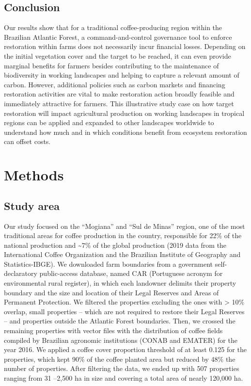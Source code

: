 \documentclass[
	12pt,				%
	oneside,			%
	a4paper,			%
	chapter=TITLE,		%
	section=TITLE,		%
	brazil,			%
	english				%
	]{abntex2}
\begin{document}
\hypertarget{conclusion}{%
\subsection{Conclusion}\label{conclusion}}

Our results show that for a traditional coffee-producing region within the Brazilian Atlantic Forest, a command-and-control governance tool to enforce restoration within farms does not necessarily incur financial losses. Depending on the initial vegetation cover and the target to be reached, it can even provide marginal benefits for farmers besides contributing to the maintenance of biodiversity in working landscapes and helping to capture a relevant amount of carbon. However, additional policies such as carbon markets and financing restoration activities are vital to make restoration action broadly feasible and immediately attractive for farmers. This illustrative study case on how target restoration will impact agricultural production on working landscapes in tropical regions can be applied and expanded to other landscapes worldwide to understand how much and in which conditions benefit from ecosystem restoration can offset costs.

\hypertarget{methods-1}{%
\section{Methods}\label{methods-1}}

\hypertarget{study-area}{%
\subsection{Study area}\label{study-area}}

Our study focused on the ``Mogiana'' and ``Sul de Minas'' region, one of the most traditional areas for coffee production in the country, responsible for 22\% of the national production and \textasciitilde7\% of the global production (2019 data from the International Coffee Organization and the Brazilian Institute of Geography and Statistics-IBGE). We downloaded farm boundaries from a government self-declaratory public-access database, named CAR (Portuguese acronym for environmental rural register), in which each landowner delimits their property boundary and the size and location of their Legal Reserves and Areas of Permanent Protection. We filtered the properties excluding the ones with \textgreater{} 10\% overlap, small properties -- which are not required to restore their Legal Reserves -- and properties outside the Atlantic Forest boundaries. Then, we crossed the remaining properties with vector files with the distribution of coffee fields compiled by Brazilian agronomic institutions (CONAB and EMATER) for the year 2016. We applied a coffee cover proportion threshold of at least 0.125 for the properties, which kept 90\% of the coffee planted area but reduced by 48\% the number of properties. After filtering the data, we ended up with 507 properties ranging from 31 --2,500 ha in size and covering a total area of nearly 120,000 ha.
\end{document}
